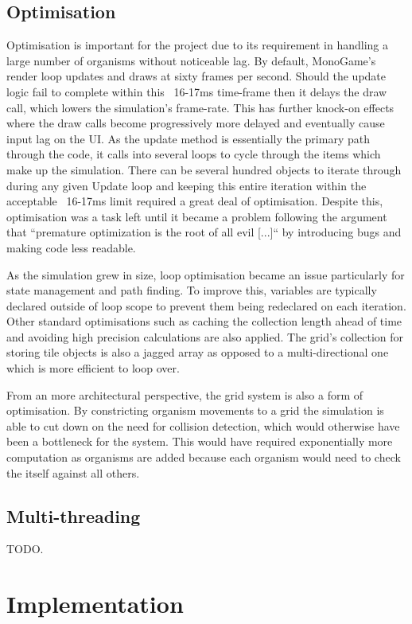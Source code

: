 \documentclass[a4paper, oneside, 11pt]{report}
\begin{document}
\section{Optimisation}\label{optim}
Optimisation is important for the project due to its requirement in handling a large number of organisms without noticeable lag. By default, MonoGame's render loop updates and draws at sixty frames per second. Should the update logic fail to complete within this ~16-17ms time-frame then it delays the draw call, which lowers the simulation's frame-rate. This has further knock-on effects where the draw calls become progressively more delayed and eventually cause input lag on the UI. As the update method is essentially the primary path through the code, it calls into several loops to cycle through the items which make up the simulation. There can be several hundred objects to iterate through during any given Update loop and keeping this entire iteration within the acceptable ~16-17ms limit required a great deal of optimisation. Despite this, optimisation was a task left until it became a problem following the argument that ``premature optimization is the root of all evil [...]`` \cite{knuth} by introducing bugs and making code less readable. 

As the simulation grew in size, loop optimisation became an issue particularly for state management and path finding. To improve this, variables are typically declared outside of loop scope to prevent them being redeclared on each iteration. Other standard optimisations such as caching the collection length ahead of time and avoiding high precision calculations are also applied. The grid's collection for storing tile objects is also a jagged array as opposed to a multi-directional one which is more efficient to loop over.

From an more architectural perspective, the grid system is also a form of optimisation. By constricting organism movements to a grid the simulation is able to cut down on the need for collision detection, which would otherwise have been a bottleneck for the system. This would have required exponentially more computation as organisms are added because each organism would need to check the itself against all others.

\section{Multi-threading}
TODO.

\chapter{Implementation} \label{implementation}
\end{document}
